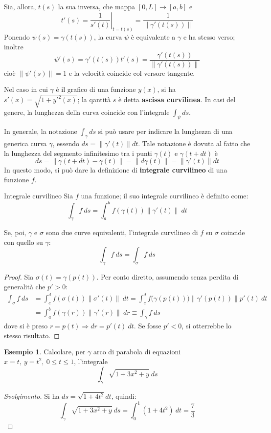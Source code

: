 \documentclass[11pt, a4paper]{scrartcl}
\newenvironment{svolgimento}{\renewcommand\qedsymbol{$\blacksquare$}\begin{proof}[Svolgimento]}{\end{proof}}
\theoremstyle{definition}
\newtheorem{esempio}{Esempio}
\numberwithin{esempio}{section}
\theoremstyle{definition}
\numberwithin{obs}{section}
\numberwithin{nota}{section}
\newcommand*\Eval[3]{\left.#1\right\rvert_{#2}^{#3}}
\numberwithin{equation}{subsection}
\begin{document}
Sia, allora, $t(s) $ la sua inversa, che mappa $\left[ 0, L \right] \to \left[ a,b \right] $ e 
\[
	t'(s) = \Eval{\frac{1}{s'(t)}}{t = t(s)}{}  = \frac{1}{\left\lVert \gamma'(t(s)) \right\rVert }
\] 
Ponendo $\psi (s) = \gamma(t(s))$, la curva $\psi $ \`e equivalente a $\gamma$ e ha stesso verso; inoltre
\[
\psi' (s) = \gamma'(t(s)) t'(s) = \frac{\gamma'(t(s))}{\left\lVert \gamma'(t(s)) \right\rVert }
\] 
cio\`e $\left\lVert \psi '(s) \right\rVert = 1$ e la velocit\`a coincide col versore tangente.

	Nel caso in cui $\gamma$ \`e il grafico di una funzione $y(x)$, si ha $s'(x) = \sqrt{1 + y'^2 (x)} $; la qantit\`a $s$ \`e detta \textbf{ascissa curvilinea}. 
	In casi del genere, la lunghezza della curva coincide con l'integrale $\int_{\psi }  ds$.

	In generale, la notazione $\int_{\gamma} ds$ si pu\`o usare per indicare la lunghezza di una generica curva $\gamma$, essendo $ds = \left\lVert \gamma'(t) \right\rVert dt $.
	Tale notazione \`e dovuta al fatto che la lunghezza del segmento infinitesimo tra i punti $\gamma(t)$ e $\gamma(t+dt)$ \`e
	\[
	ds = \left\lVert \gamma(t+dt) - \gamma(t) \right\rVert = \left\lVert d\gamma(t) \right\rVert  = \left\lVert \gamma'(t) \right\rVert  dt 
	\] 
In questo modo, si pu\`o dare la definizione di \textbf{integrale curvilineo} di una funzione $f$.
\begin{definizione}
	{Integrale curvilineo}{}
	Sia $f$	una funzione; il suo integrale curvilineo \`e definito come:
	\[
	\int_{\gamma} f \ ds = \int_{a} ^b f(\gamma(t)) \left\lVert \gamma' (t)\right\rVert \ dt 
	\] 
\end{definizione}
Se, poi, $\gamma$ e $\sigma $ sono due curve equivalenti, l'integrale curvilineo di $f$ su $\sigma $ coincide con quello su $\gamma$:
\begin{equation}
	\int_{\gamma}  f \ ds = \int_{\sigma } f \ ds
\end{equation}
\begin{proof}
	Sia $\sigma (t) = \gamma(p(t))$. Per conto diretto, assumendo senza perdita di generalit\`a che $p' > 0$:
	\[
		\begin{split}
			\int_{\sigma } f \ ds &= \int_{c} ^d f(\sigma (t)) \left\lVert \sigma '(t) \right\rVert  \ dt = \int_{c} ^d f\big(\gamma(p(t))\big)\left\lVert \gamma'(p(t)) \right\rVert p'(t) \ dt\\
					      &= \int_{a} ^b f(\gamma(r)) \left\lVert \gamma'(r) \right\rVert  \ dr \equiv \int_{\gamma} f \ ds
		\end{split}
	\] 
dove si \`e preso $r = p(t)\Rightarrow dr = p'(t) \ dt $. 
Se fosse $p'<0$, si otterrebbe lo stesso risultato.
\end{proof}
\begin{esempio}
Calcolare, per $\gamma$ arco di parabola di equazioni $x = t  , \ y = t^2, \ 0\le t \le  1$, l'integrale
\[
\int_{\gamma}  \sqrt{1 + 3x^2 +y }  \ ds
\] 
\begin{svolgimento}
	Si ha $ds = \sqrt{1 + 4t^2}  dt  $, quindi:
	\[
	\int_{\gamma} \sqrt{1+ 3x^2 + y}  \ ds = \int_{0} ^1 (1+4t^2) \ dt = \frac{7}{3}
	\] 
	
\end{svolgimento}
\end{esempio}
\end{document}
